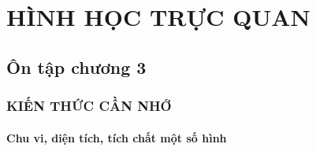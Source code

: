 \def\i{\item}
\graphicspath{{../pictures/vande38/}}
\chapter{HÌNH HỌC TRỰC QUAN}
\section{Ôn tập chương 3} 
\subsection{KIẾN THỨC CẦN NHỚ}
\subsubsection{Chu vi, diện tích, tích chất một số hình}
